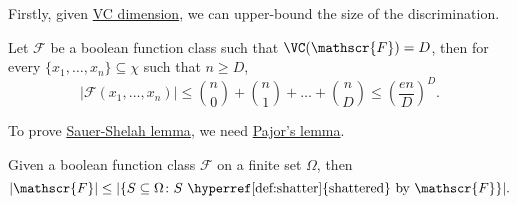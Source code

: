Firstly, given \hyperref[def:VC-dimension]{VC dimension}, we can upper-bound the size of the discrimination.

\begin{lemma}\label{lma:Sauer-Shelah}
	Let \(\mathscr{F} \) be a boolean function class such that \(\VC(\mathscr{F}) = D\), then for every \(\{ x_1, \dots , x_n \} \subseteq \chi \) such that \(n \geq D\),
	\[
		\vert \mathscr{F} (x_1, \dots , x_n) \vert
		\leq \binom{n}{0} + \binom{n}{1} + \dots + \binom{n}{D}
		\leq \left( \frac{en}{D} \right) ^D.
	\]
\end{lemma}

To prove \hyperref[lma:Sauer-Shelah]{Sauer-Shelah lemma}, we need \hyperref[lma:Pajor]{Pajor's lemma}.

\begin{lemma}\label{lma:Pajor}
	Given a boolean function class \(\mathscr{F} \) on a finite set \(\Omega \), then
	\[
		\vert \mathscr{F} \vert \leq \vert \{ S \subseteq \Omega \colon S \text{ \hyperref[def:shatter]{shattered} by } \mathscr{F} \} \vert.
	\]
\end{lemma}

